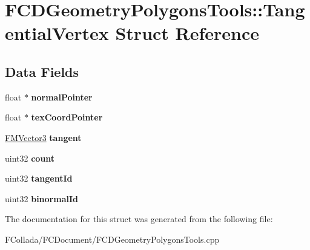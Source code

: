 \hypertarget{structFCDGeometryPolygonsTools_1_1TangentialVertex}{
\section{FCDGeometryPolygonsTools::TangentialVertex Struct Reference}
\label{structFCDGeometryPolygonsTools_1_1TangentialVertex}
}
\subsection*{Data Fields}
\begin{DoxyCompactItemize}
\item 
\hypertarget{structFCDGeometryPolygonsTools_1_1TangentialVertex_a21cee22c13308ed6a94188d502f753af}{
float $\ast$ {\bfseries normalPointer}}
\label{structFCDGeometryPolygonsTools_1_1TangentialVertex_a21cee22c13308ed6a94188d502f753af}

\item 
\hypertarget{structFCDGeometryPolygonsTools_1_1TangentialVertex_a1bfd50b79d823108a4a090ebc3c00f09}{
float $\ast$ {\bfseries texCoordPointer}}
\label{structFCDGeometryPolygonsTools_1_1TangentialVertex_a1bfd50b79d823108a4a090ebc3c00f09}

\item 
\hypertarget{structFCDGeometryPolygonsTools_1_1TangentialVertex_aba5fe9a0dd4089fa02eacfac43e42590}{
\hyperlink{classFMVector3}{FMVector3} {\bfseries tangent}}
\label{structFCDGeometryPolygonsTools_1_1TangentialVertex_aba5fe9a0dd4089fa02eacfac43e42590}

\item 
\hypertarget{structFCDGeometryPolygonsTools_1_1TangentialVertex_ad6feb38d7f27dbad3afb67db690a7679}{
uint32 {\bfseries count}}
\label{structFCDGeometryPolygonsTools_1_1TangentialVertex_ad6feb38d7f27dbad3afb67db690a7679}

\item 
\hypertarget{structFCDGeometryPolygonsTools_1_1TangentialVertex_a455c5f503f06178d445ef4a4c763c5de}{
uint32 {\bfseries tangentId}}
\label{structFCDGeometryPolygonsTools_1_1TangentialVertex_a455c5f503f06178d445ef4a4c763c5de}

\item 
\hypertarget{structFCDGeometryPolygonsTools_1_1TangentialVertex_af66eecc24f585c8965440aa078bd1edb}{
uint32 {\bfseries binormalId}}
\label{structFCDGeometryPolygonsTools_1_1TangentialVertex_af66eecc24f585c8965440aa078bd1edb}

\end{DoxyCompactItemize}


The documentation for this struct was generated from the following file:\begin{DoxyCompactItemize}
\item 
FCollada/FCDocument/FCDGeometryPolygonsTools.cpp\end{DoxyCompactItemize}
